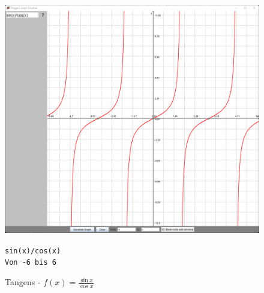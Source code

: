 \documentclass[12pt]{article}
\begin{document}
	\begin{figure}[!ht]
		\begin{center}
			\includegraphics[scale=0.5]{images/sample3.png}
		\end{center}
		\caption{Tangens - $f(x) = \frac{\sin{x}}{\cos{x}}$}

		\begin{center}
			\texttt{sin(x)/cos(x)} \\
			\texttt{Von -6 bis 6}
		\end{center}
	\end{figure}
\end{document}
